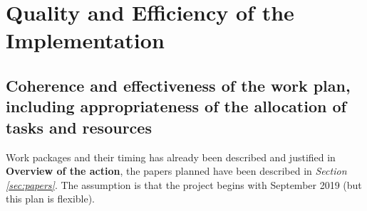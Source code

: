 \documentclass[11pt, a4paper]{article}
\begin{document}




\vspace{-3mm}


\section{Quality and Efficiency of the Implementation}


\vspace{-3mm}

\subsection{Coherence and effectiveness of the work plan, including appropriateness of
the allocation of tasks and resources}

\vspace{-3mm}

Work packages and their timing has already been described and justified in \textbf{Overview of the action}, the  papers planned have been  described in \emph{Section \ref{sec:papers}}.  The assumption is that the project begins with September 2019 (but this plan is flexible).

\vspace{-5mm}
\end{document}
